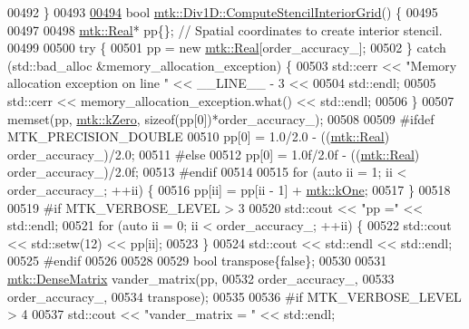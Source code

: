 \begin{DoxyCode}
{{00492 \}
00493 
\hypertarget{mtk__div__1d_8cc_source_l00494}{}\hyperlink{classmtk_1_1Div1D_a3eb3a32862a6b066cd583cbbd00a6509}{00494} \textcolor{keywordtype}{bool} \hyperlink{classmtk_1_1Div1D_a3eb3a32862a6b066cd583cbbd00a6509}{mtk::Div1D::ComputeStencilInteriorGrid}() \{
00495 
00497 
00498   \hyperlink{group__c01-roots_gac080bbbf5cbb5502c9f00405f894857d}{mtk::Real}* pp\{\}; \textcolor{comment}{// Spatial coordinates to create interior stencil.}
00499 
00500   \textcolor{keywordflow}{try} \{
00501     pp = \textcolor{keyword}{new} \hyperlink{group__c01-roots_gac080bbbf5cbb5502c9f00405f894857d}{mtk::Real}[order\_accuracy\_];
00502   \} \textcolor{keywordflow}{catch} (std::bad\_alloc &memory\_allocation\_exception) \{
00503     std::cerr << \textcolor{stringliteral}{"Memory allocation exception on line "} << \_\_LINE\_\_ - 3 <<
00504       std::endl;
00505     std::cerr << memory\_allocation\_exception.what() << std::endl;
00506   \}
00507   memset(pp, \hyperlink{group__c01-roots_ga59a451a5fae30d59649bcda274fea271}{mtk::kZero}, \textcolor{keyword}{sizeof}(pp[0])*order\_accuracy\_);
00508 
00509 \textcolor{preprocessor}{  #ifdef MTK\_PRECISION\_DOUBLE}
00510   pp[0] = 1.0/2.0 - ((\hyperlink{group__c01-roots_gac080bbbf5cbb5502c9f00405f894857d}{mtk::Real}) order\_accuracy\_)/2.0;
00511 \textcolor{preprocessor}{  #else}
00512   pp[0] = 1.0f/2.0f - ((\hyperlink{group__c01-roots_gac080bbbf5cbb5502c9f00405f894857d}{mtk::Real}) order\_accuracy\_)/2.0f;
00513 \textcolor{preprocessor}{  #endif}
00514 
00515   \textcolor{keywordflow}{for} (\textcolor{keyword}{auto} ii = 1; ii < order\_accuracy\_; ++ii) \{
00516     pp[ii] = pp[ii - 1] + \hyperlink{group__c01-roots_ga26407c24d43b6b95480943340d285c71}{mtk::kOne};
00517   \}
00518 
00519 \textcolor{preprocessor}{  #if MTK\_VERBOSE\_LEVEL > 3}
00520   std::cout << \textcolor{stringliteral}{"pp ="} << std::endl;
00521   \textcolor{keywordflow}{for} (\textcolor{keyword}{auto} ii = 0; ii < order\_accuracy\_; ++ii) \{
00522     std::cout << std::setw(12) << pp[ii];
00523   \}
00524   std::cout << std::endl << std::endl;
00525 \textcolor{preprocessor}{  #endif}
00526 
00528 
00529   \textcolor{keywordtype}{bool} transpose\{\textcolor{keyword}{false}\};
00530 
00531   \hyperlink{classmtk_1_1DenseMatrix}{mtk::DenseMatrix} vander\_matrix(pp,
00532                                  order\_accuracy\_,
00533                                  order\_accuracy\_,
00534                                  transpose);
00535 
00536 \textcolor{preprocessor}{  #if MTK\_VERBOSE\_LEVEL > 4}
00537   std::cout << \textcolor{stringliteral}{"vander\_matrix = "} << std::endl;
}}
\end{DoxyCode}
